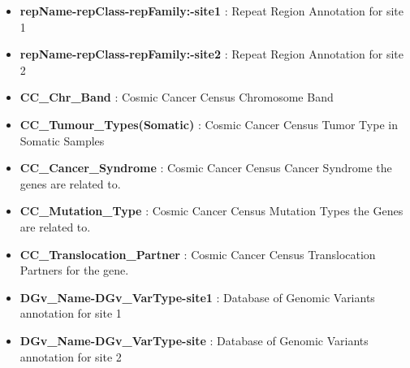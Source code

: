 \documentclass[letterpaper,10pt,english]{sphinxmanual}
\begin{document}
\begin{itemize}
\item {} 
\textbf{repName-repClass-repFamily:-site1} : Repeat Region Annotation for site 1

\item {} 
\textbf{repName-repClass-repFamily:-site2} : Repeat Region Annotation for site 2

\item {} 
\textbf{CC\_Chr\_Band} : Cosmic Cancer Census Chromosome Band

\item {} 
\textbf{CC\_Tumour\_Types(Somatic)} : Cosmic Cancer Census Tumor Type in Somatic Samples

\item {} 
\textbf{CC\_Cancer\_Syndrome} : Cosmic Cancer Census Cancer Syndrome the genes are related to.

\item {} 
\textbf{CC\_Mutation\_Type} : Cosmic Cancer Census Mutation Types the Genes are related to.

\item {} 
\textbf{CC\_Translocation\_Partner} : Cosmic Cancer Census Translocation Partners for the gene.

\item {} 
\textbf{DGv\_Name-DGv\_VarType-site1} : Database of Genomic Variants annotation for site 1

\item {} 
\textbf{DGv\_Name-DGv\_VarType-site} : Database of Genomic Variants annotation for site 2

\end{itemize}
\begin{quote}\begin{description}
\item[{Example Plot}] \leavevmode
{\hspace*{\fill}}\hspace*{\fill}}

\end{description}\end{quote}
\end{document}
